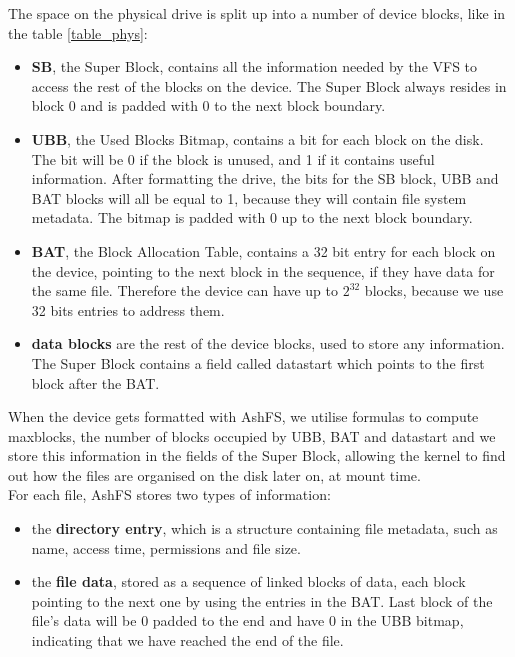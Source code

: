 \documentclass[conference]{IEEEtran}
\begin{document}
The space on the physical drive is split up into a number of device blocks, like in the table \ref{table_phys}:
\begin{itemize}
\item
{\bf SB}, the Super Block, contains all the information needed by the VFS to access the rest of the blocks on the device. The
Super Block always resides in block 0 and is padded with 0 to the next block boundary.\\
\item
{\bf UBB}, the Used Blocks Bitmap, contains a bit for each block on the disk.
The bit will be 0 if the block is unused, and 1 if it contains useful information. After formatting the drive, the bits
for the SB block, UBB and BAT blocks will all be equal to 1, because they will contain file system metadata. The bitmap is padded with
0 up to the next block boundary.\\
\item
{\bf BAT}, the Block Allocation Table, contains a 32 bit entry for each block on the device, pointing to the next block in the sequence,
if they have data for the same file. Therefore the device can have up to $2^{32}$ blocks, because we use 32 bits entries to address them.\\
\item
{\bf data blocks} are the rest of the device blocks, used to store any information. The Super Block contains a field called datastart which
points to the first block after the BAT.
\end{itemize}

When the device gets formatted with AshFS, we utilise formulas to compute maxblocks, the number of blocks occupied by UBB, BAT and datastart
and we store this information in the fields of the Super Block, allowing the kernel to find out how the files are organised on the disk
later on, at mount time.\\

For each file, AshFS stores two types of information:
\begin{itemize}
\item
the {\bf directory entry}, which is a structure containing file metadata, such as name, access time, permissions and file size.\\
\item
the {\bf file data}, stored as a sequence of linked blocks of data, each block pointing to the next one by using the entries in the
BAT. Last block of the file's data will be 0 padded to the end and have 0 in the UBB bitmap, indicating that we have reached the end
of the file.\\
\end{itemize}
\end{document}
